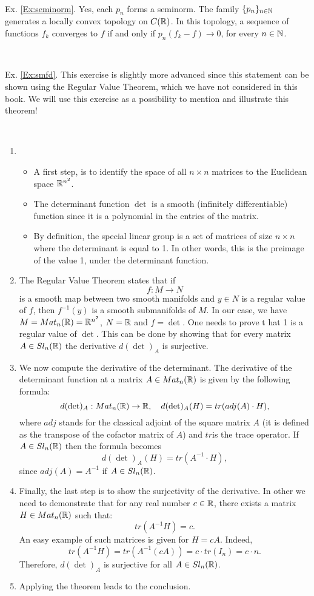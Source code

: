 \, 

Ex. \ref{Ex:seminorm}. Yes, each $p_n$ forms a seminorm. The family $\{p_n\}_{n\in \mathbb{N}}$ generates a locally convex topology on $C(\mathbb{R})$. In this topology, a sequence of functions $f_k$ converges to $f$ if and only if $p_n(f_k-f)\to 0$, for every $n\in \mathbb{N}$.  

\, 

Ex. \ref{Ex:smfd}.
This exercise is slightly more advanced since this statement can be shown using the Regular Value Theorem, which we have not considered in this book. We will use this exercise as a possibility to mention and illustrate this theorem! 

\, 
\begin{enumerate}
    \item \begin{itemize}
    \item A first step, is to identify the space of all $n\times n$ matrices to the Euclidean space $\mathbb{R}^{n^2}$. 
\item The determinant function $\det$ is a smooth (infinitely differentiable) function since it is a polynomial in the entries of the matrix.
\item By definition,  the special linear group is a set of matrices of size $n\times n$ where the determinant is equal to 1. In other words, this is the preimage of the value 1, under the determinant function.
\end{itemize}
\item The Regular Value Theorem states that if \[f:M\to N\] is a smooth map between two smooth manifolds and $y\in N$ is a regular value of $f$, then $f^{-1}(y)$ is a smooth submanifolds of $M$. In our case, we have $M=Mat_n(\mathbb{R})=\mathbb{R}^{n^2}$, $N=\mathbb{R}$ and $f=\det$. One needs to prove t hat 1 is a regular value of $\det$. This can be done by showing that for every matrix $A\in Sl_n(\mathbb{R})$ the derivative $d(\det)_A$ is surjective. 
\item We now compute the derivative of the determinant. The derivative of the determinant function at a matrix $A\in Mat_n(\mathbb{R})$ is given by the following formula: 
\[d(\det)_A:Mat_n(\mathbb{R})\to \mathbb{R},\quad d(\det)_A(H)=tr(adj(A)\cdot H),\]
where $adj$ stands for the classical adjoint of the square matrix $A$ (it is defined as the transpose of the cofactor matrix of $A$) and $tr $is the trace operator. If $A\in Sl_n(\mathbb{R})$ then the formula becomes
\[d(\det)_A(H)=tr(A^{-1}\cdot H),\] since $adj(A)=A^{-1}$ if $A\in Sl_n(\mathbb{R})$.

\item Finally, the last step is to show the surjectivity of the derivative.  In other we need to demonstrate that for any real number $c\in \mathbb{R}$, there exists a matrix $H\in Mat_n(\mathbb{R})$ such that:
\[tr(A^{-1}H)=c.\]
An easy example of such matrices is given for $H=cA$. 
Indeed, \[tr(A^{-1}H)=tr(A^{-1}(cA))=c\cdot tr(I_n)=c\cdot n.\]
Therefore, $d(\det)_A$ is surjective for all $A\in Sl_n(\mathbb{R})$.
\item Applying the theorem leads to the conclusion. 
\end{enumerate}
\, 

